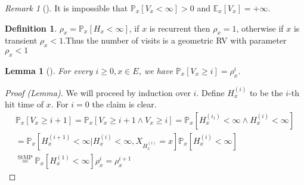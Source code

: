 \documentclass[12pt]{book}
\newtheorem{lemma}[theorem]{Lemma}
\theoremstyle{definition}
\newtheorem{defn}{Definition}[section]
\theoremstyle{remark}
\newtheorem{rmk}[theorem]{Remark}
\begin{document}
\begin{rmk}[]
It is impossible that $\mathbb{P}_{x} \left[ V_x<\infty \right] >0 $ and $\mathbb{E}_{x} \left[ V_x \right] =+\infty$.
\end{rmk}


\begin{defn}
	$\rho_x = \mathbb{P}_{x} \left[ H_x<\infty \right]$, if $x$ is recurrent then $\rho_x=1$, otherwise if $x$ is transient $\rho_x<1$.Thus the number of visits is a geometric RV with parameter $\rho_x<1$ 
\end{defn}

\begin{lemma}[]
	For every $i\geq 0, x \in E$, we have $\mathbb{P}_{x} \left[ V_x \geq i \right] = \rho_x^{i}$.
\end{lemma}

\begin{proof}[Proof (Lemma)]
	We will proceed by induction over $i$. Define $H_x^{(i)}$ to be the $i$-th hit time of $x$. For $i=0$ the claim is clear.
	\begin{gather}
		\mathbb{P}_{x} \left[ V_x \geq i+1 \right] = \mathbb{P}_{x} \left[ V_x \geq i+1 \wedge V_x \geq i \right] = \mathbb{P}_{x} \left[ H_x^{(i_1)} < \infty \wedge H_x^{(i)} < \infty \right] \\
		= \mathbb{P}_{x} \left[ H_x^{(i+1)} < \infty | H_x^{(i)} < \infty, X_{H_x^{(i)}}=x \right] \mathbb{P}_{x} \left[ H_x^{(i)} < \infty \right] \\
		\stackrel{\text{StMP}}{=} \mathbb{P}_{x} \left[ H_x^{(1)} < \infty \right] \rho_x^i = \rho_x^{i+1}   
	\end{gather}
\end{proof}
\end{document}
